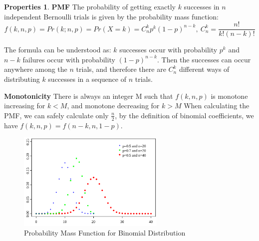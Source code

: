 \documentclass{article}
\theoremstyle{definition}
\newtheorem{prop}{Properties}[section]
\begin{document}
\begin{prop}
\textbf{PMF} The probability of getting exactly $k$ successes in $n$ independent Bernoulli trials is given by the probability mass function: $$f(k,n,p)=Pr(k;n,p)=Pr(X=k)=C_{n}^{k}p^k(1-p)^{n-k}, \: C_{n}^{k}=\frac{n!}{k!(n-k)!}$$

The formula can be understood as: $k$ successes occur with probability $p^k$ and $n-k$ failures occur with probability $(1-p)^{n-k}$. Then the successes can occur anywhere among the $n$ trials, and therefore there are $C_{n}^{k}$ different ways of distributing $k$ successes in a sequence of $n$ trials.

\textbf{Monotonicity} There is always an integer M such that $f(k,n,p)$ is monotone increasing for $k<M$, and monotone decreasing for $k>M$
When calculating the PMF, we can safely calculate only $\frac{n}{2}$, by the definition of binomial coefficients, we have $f(k,n,p)=f(n-k,n,1-p)$.

\begin{figure}[h]
\caption{Probability Mass Function for Binomial Distribution}
\centering
\includegraphics[width=200pt]{Statistics/images/Binomial_distribution_pmf.pdf}
\end{figure}

\end{prop}
\end{document}
